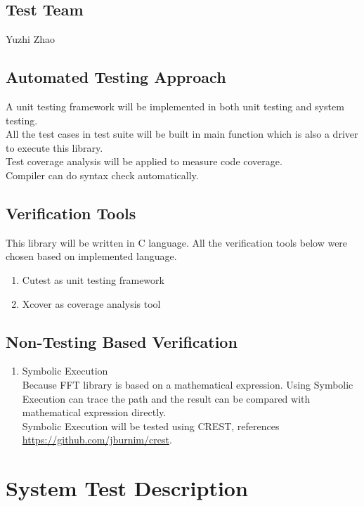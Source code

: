 \documentclass[12pt, titlepage]{article}
\begin{document}
\subsection{Test Team}
Yuzhi Zhao

\subsection{Automated Testing Approach}
A unit testing framework will be implemented in both unit testing and system testing.\\
All the test cases in test suite will be built in main function which is also a driver to execute this library.\\
Test coverage analysis will be applied to measure code coverage.\\
Compiler can do syntax check automatically.

\subsection{Verification Tools}
This library will be written in C language. All the verification tools below were chosen based on implemented language.
\begin{enumerate}
\item {{\large Cutest} as unit testing framework}
\item {{\large Xcover} as coverage analysis tool}
\end{enumerate}



\subsection{Non-Testing Based Verification}
\begin{enumerate}
\item {Symbolic Execution}\\Because FFT library is based on a mathematical expression. Using Symbolic Execution can trace the path and the result can be compared with mathematical expression directly.\\
 Symbolic Execution will be tested using CREST, references \url {https://github.com/jburnim/crest}.

\end{enumerate}


\section{System Test Description}
	
\end{document}
